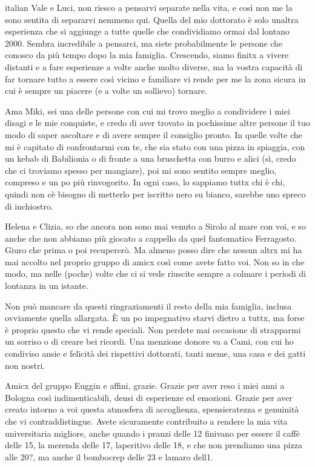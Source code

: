 \begin{otherlanguage*}{italian}
Vale e Luci, non riesco a pensarvi separate nella vita, e così non me la sono sentita di separarvi nemmeno qui. Quella del mio dottorato è solo un\curlyapostrophe{}altra esperienza che si aggiunge a tutte quelle che condividiamo ormai dal lontano 2000. Sembra incredibile a pensarci, ma siete probabilmente le persone che conosco da più tempo dopo la mia famiglia. Crescendo, siamo finitx a vivere distanti e a fare esperienze a volte anche molto diverse, ma la vostra capacità di far tornare tutto a essere così vicino e familiare vi rende per me la zona sicura in cui è sempre un piacere (e a volte un sollievo) tornare.

Ama Miki, sei una delle persone con cui mi trovo meglio a condividere i miei disagi e le mie conquiste, e credo di aver trovato in pochissime altre persone il tuo modo di saper ascoltare e di avere sempre il consiglio pronto. In quelle volte che mi è capitato di confrontarmi con te, che sia stato con una pizza in spiaggia, con un kebab di Babilionia o di fronte a una bruschetta con burro e alici (sì, credo che ci troviamo spesso per mangiare), poi mi sono sentito sempre meglio, compreso e un po\curlyapostrophe{} più rinvogorito. In ogni caso, lo sappiamo tuttx chi è chi, quindi non c\curlyapostrophe{}è bisogno di metterlo per iscritto nero su bianco, sarebbe uno spreco di inchiostro.

Helena e Clizia, so che ancora non sono mai venuto a Sirolo al mare con voi, e so anche che non abbiamo più giocato a cappello da quel fantomatico Ferragosto. Giuro che prima o poi recupererò. Ma almeno posso dire che nessun altrx mi ha mai accolto nel proprio gruppo di amicx così come avete fatto voi. Non so in che modo, ma nelle (poche) volte che ci si vede riuscite sempre a colmare i periodi di lontanza in un istante.

Non può mancare da questi ringraziamenti il resto della mia famiglia, inclusa ovviamente quella allargata. È un po\curlyapostrophe{} impegnativo starvi dietro a tuttx, ma forse è proprio questo che vi rende speciali. Non perdete mai occasione di strapparmi un sorriso o di creare bei ricordi. Una menzione d\curlyapostrophe{}onore va a Cami, con cui ho condiviso ansie e felicità dei rispettivi dottorati, tanti meme, una casa e dei gatti non nostri. 

Amicx del gruppo Euggin e affini, grazie. Grazie per aver reso i miei anni a Bologna così indimenticabili, densi di esperienze ed emozioni. Grazie per aver creato intorno a voi questa atmosfera di accoglienza, spensieratezza e genuinità che vi contraddistingue. Avete sicuramente contribuito a rendere la mia vita universitaria migliore, anche quando i pranzi delle 12 finivano per essere il caffè delle 15, la merenda delle 17, l\curlyapostrophe{}aperitivo delle 18, e che non prendiamo una pizza alle 20?, ma anche il bombocrep delle 23 e l\curlyapostrophe{}amaro dell\curlyapostrophe{}1.


\end{otherlanguage*}
